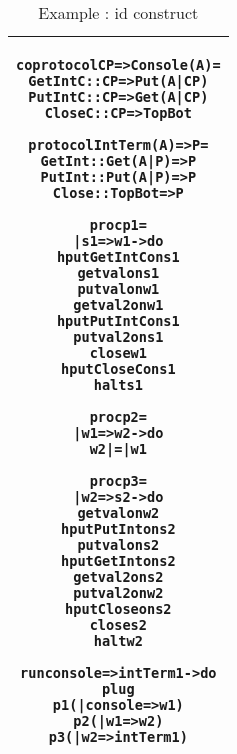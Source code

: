 \documentclass[11pt]{article}
\newcommand{\<}{\langle}
\renewcommand{\>}{\rangle}
\begin{document}
\begin{table}
\begin{center}
\begin{tabular}{|c|} \hline
\begin{minipage}{5in}
{
\begin{alltt}


      coprotocol CP => Console (A) =
          GetIntC   :: CP => Put (A|CP)  
          PutIntC   :: CP => Get (A|CP) 
          CloseC    :: CP => TopBot  

      protocol IntTerm (A) => P =
          GetInt   :: Get (A|P) => P 
          PutInt   :: Put (A|P) => P
          Close    :: TopBot    => P  

      proc p1 = 
        | s1 => w1 -> do 
             hput GetIntC on s1
             get val on s1
             put val on w1
             get val2 on w1
             hput PutIntC on s1
             put val2 on s1 
             close w1
             hput CloseC on s1
             halt s1

      proc p2 =
        | w1 => w2 -> do 
             w2 |=| w1 

      proc  p3 =
          | w2 => s2 -> do 
             get val on w2 
             hput PutInt on s2
             put val on s2
             hput GetInt on s2
             get val2 on s2
             put val2 on w2
             hput Close on s2
             close s2
             halt w2  


      run console => intTerm1 -> do 
          plug 
            p1 ( | console => w1)
            p2 ( | w1 => w2)
            p3 ( | w2 => intTerm1) 


\end{alltt}

} 
\end {minipage} 
\tabularnewline
\hline
\end{tabular}
\caption{Example : {\sf id} construct}
\label{Conc : idExample}
\end{center}
\end{table}
\end{document}
